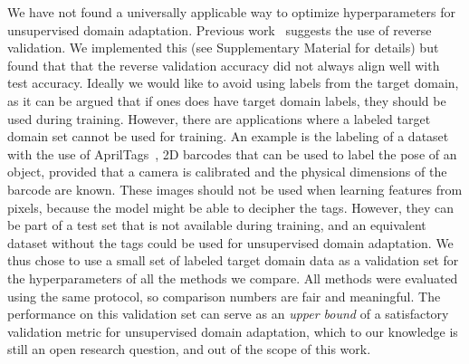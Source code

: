 \documentclass{article}
\begin{document}
We have not found a universally applicable way to optimize hyperparameters for unsupervised domain adaptation.  Previous work~\cite{ganin2016domain} suggests the use of reverse validation. We implemented this (see Supplementary Material for details) but found that that the reverse validation accuracy did not always align well with test accuracy. Ideally we would like to avoid using labels from the target domain, as it can be argued that if ones does have target domain labels, they should be used during training. However, there are applications where a labeled target domain set cannot be used for training. An example is the labeling of a dataset with the use of AprilTags~\cite{olson2011apriltag}, 2D barcodes that can be used to label the pose of an object, provided that a camera is calibrated and the physical dimensions of the barcode are known. These images should not be used when learning features from pixels, because the model might be able to decipher the tags. However, they can be part of a test set that is not available during training, and an equivalent dataset without the tags could be used for unsupervised domain adaptation.
 We thus chose to use a small set of labeled target domain data as a validation set for the hyperparameters of all the methods we compare. All methods were evaluated using the same protocol, so comparison numbers are fair and meaningful. The performance on this validation set can serve as an \textsl{upper bound} of a satisfactory validation metric for unsupervised domain adaptation, which to our knowledge is still an open research question, and out of the scope of this work. 
\end{document}
